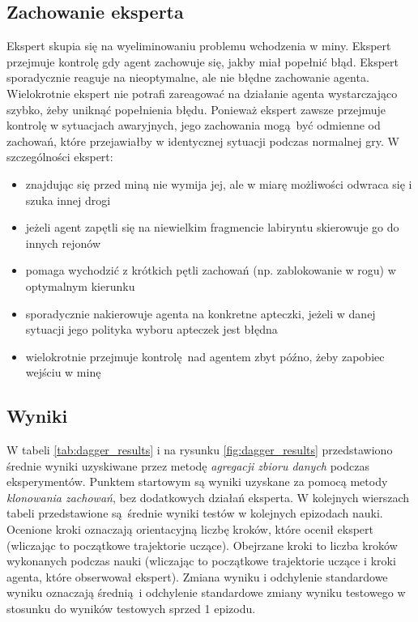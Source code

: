 \subsection {Zachowanie eksperta}
Ekspert skupia się na wyeliminowaniu problemu wchodzenia w miny. Ekspert przejmuje kontrolę gdy agent zachowuje się, jakby miał popełnić błąd. Ekspert sporadycznie reaguje na nieoptymalne, ale nie błędne zachowanie agenta. Wielokrotnie ekspert nie potrafi zareagować na działanie agenta wystarczająco szybko, żeby uniknąć popełnienia błędu. Ponieważ ekspert zawsze przejmuje kontrolę w sytuacjach awaryjnych, jego zachowania mogą być odmienne od zachowań, które przejawiałby w identycznej sytuacji podczas normalnej gry. W szczególności ekspert:

\begin{itemize}
\item{znajdując się przed miną nie wymija jej, ale w miarę możliwości odwraca się i szuka innej drogi}
\item{jeżeli agent zapętli się na niewielkim fragmencie labiryntu skierowuje go do innych rejonów}
\item{pomaga wychodzić z krótkich pętli zachowań (np. zablokowanie w rogu) w optymalnym kierunku}
\item{sporadycznie nakierowuje agenta na konkretne apteczki, jeżeli w danej sytuacji jego polityka wyboru apteczek jest błędna}
\item{wielokrotnie przejmuje kontrolę nad agentem zbyt późno, żeby zapobiec wejściu w minę}
\end{itemize}


\subsection{Wyniki}\label{dagger_results}
W tabeli \ref{tab:dagger_results} i na rysunku \ref{fig:dagger_results} przedstawiono średnie wyniki uzyskiwane przez metodę \textit{agregacji zbioru danych} podczas eksperymentów. Punktem startowym są wyniki uzyskane za pomocą metody \textit{klonowania zachowań}, bez dodatkowych działań eksperta. W kolejnych wierszach tabeli przedstawione są średnie wyniki testów w kolejnych epizodach nauki. Ocenione kroki oznaczają orientacyjną liczbę kroków, które ocenił ekspert (wliczając to początkowe trajektorie uczące). Obejrzane kroki to liczba kroków wykonanych podczas nauki (wliczając to początkowe trajektorie uczące i kroki agenta, które obserwował ekspert). Zmiana wyniku i odchylenie standardowe wyniku oznaczają średnią i odchylenie standardowe zmiany wyniku testowego w stosunku do wyników testowych sprzed 1 epizodu. 


